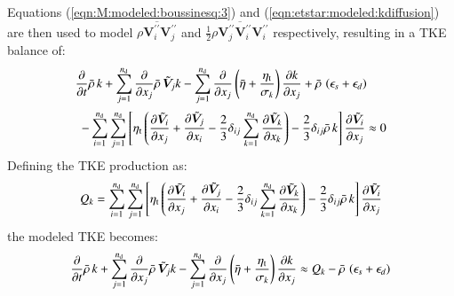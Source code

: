 \documentclass{warpdoc}
\newcommand{\alb}{\vspace{0.2cm}\\} %
\newcommand{\nd}{{{n}_{\rm d}}}
\newcommand{\turb}{_{\rm t}}
\newcommand{\etat}{{\eta\turb}}
\newcommand{\mfd}{\displaystyle}
\begin{document}
Equations (\ref{eqn:M:modeled:boussinesq:3}) and (\ref{eqn:etstar:modeled:kdiffusion})
are then used to model $ \overline{\rho \bm{V}_i^{{\prime\prime}} \bm{V}_j^{{\prime\prime}}} $ and
$ {\frac{1}{2}} \overline{\rho {\bm{V}_j^{{\prime\prime}}} \bm{V}_i^{{\prime\prime}} \bm{V}_i^{{\prime\prime}}} $ respectively,
resulting in a TKE balance of:
%
\begin{equation}
  \begin{array}{l}
  \mfd
    \frac{\partial }{\partial t} \wbar{\rho}\, k
   +  \sum_{j=1}^{\nd}\frac{\partial }{\partial x_j} \wbar{\rho}\, {\wtilde{\bm{V}}_j} k
   - \mfd\sum_{j=1}^{\nd} \frac{\partial }{\partial x_j}
     \left( \wbar{\eta}+\frac{\etat}{\sigma_k} \right) \frac{\partial k}{\partial x_j}
   + \wbar{\rho}\,\left( \epsilon_s+\epsilon_d \right) \alb~~
   - \mfd\sum_{i=1}^\nd \sum_{j=1}^{\nd}
         \left[ \etat \left(
           \frac{\partial {\wtilde{\bm{V}}_i}}{\partial x_j}
           +\frac{\partial {\wtilde{\bm{V}}_j}}{\partial x_i}
           -\frac{2}{3} \delta_{ij} \sum_{k=1}^\nd \frac{\partial {\wtilde{\bm{V}}_k}}{\partial x_k}
            \right)
           - \frac{2}{3} \delta_{ij} \wbar{\rho}\, k
         \right]
         \frac{\partial {\wtilde{\bm{V}}_i}}{\partial x_j}
   \approx 0 
  \end{array}
  \label{eqn:TKE:modeled:2}
\end{equation}
%
Defining the TKE production as:
%
\begin{equation}
  Q_k = \mfd\sum_{i=1}^\nd \sum_{j=1}^{\nd}
         \left[ \etat \left(
           \frac{\partial {\wtilde{\bm{V}}_i}}{\partial x_j}
           +\frac{\partial {\wtilde{\bm{V}}_j}}{\partial x_i}
           -\frac{2}{3} \delta_{ij} \sum_{k=1}^\nd \frac{\partial {\wtilde{\bm{V}}_k}}{\partial x_k}
            \right)
           - \frac{2}{3} \delta_{ij} \wbar{\rho}\, k
         \right]
         \frac{\partial {\wtilde{\bm{V}}_i}}{\partial x_j}
\label{eqn:Pk}
\end{equation}
%
the modeled TKE becomes:
%
%
\begin{equation}
    \frac{\partial }{\partial t} \wbar{\rho}\, k
   +  \sum_{j=1}^{\nd}\frac{\partial }{\partial x_j} \wbar{\rho}\, {\wtilde{\bm{V}}_j} k
   - \sum_{j=1}^{\nd} \frac{\partial }{\partial x_j}
     \left( \wbar{\eta}+\frac{\etat}{\sigma_k} \right) \frac{\partial k}{\partial x_j}
   \approx 
  Q_k
   - \wbar{\rho}\, \left( \epsilon_s+\epsilon_d \right)
  \label{eqn:TKE:modeled:final}
\end{equation}
%
\end{document}
